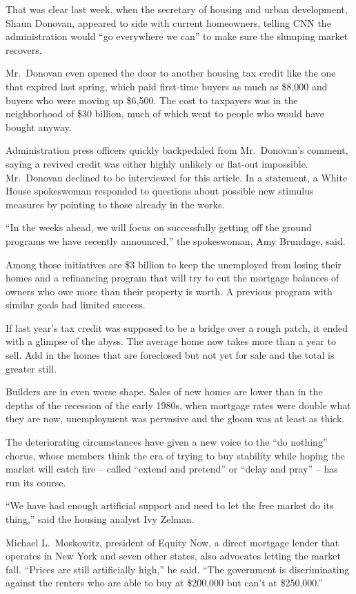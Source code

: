 ﻿\documentclass[12pt]{article}
\begin{document}
That was clear last week, when the secretary of housing and urban development, Shaun Donovan,
appeared to side with current homeowners, telling CNN the administration would ``go everywhere we
can'' to make sure the slumping market recovers.

Mr.~Donovan even opened the door to another housing tax credit like the one that expired last
spring, which paid first-time buyers as much as \$8,000 and buyers who were moving up \$6,500. The
cost to taxpayers was in the neighborhood of \$30 billion, much of which went to people who would
have bought anyway.

Administration press officers quickly backpedaled from Mr.~Donovan's comment, saying a revived
credit was either highly unlikely or flat-out impossible. Mr.~Donovan declined to be interviewed for
this article. In a statement, a White House spokeswoman responded to questions about possible new
stimulus measures by pointing to those already in the works.

``In the weeks ahead, we will focus on successfully getting off the ground programs we have recently
announced,'' the spokeswoman, Amy Brundage, said.

Among those initiatives are \$3 billion to keep the unemployed from losing their homes and a
refinancing program that will try to cut the mortgage balances of owners who owe more than their
property is worth. A previous program with similar goals had limited success.

If last year's tax credit was supposed to be a bridge over a rough patch, it ended with a glimpse of
the abyss. The average home now takes more than a year to sell. Add in the homes that are foreclosed
but not yet for sale and the total is greater still.

Builders are in even worse shape. Sales of new homes are lower than in the depths of the recession
of the early 1980s, when mortgage rates were double what they are now, unemployment was pervasive
and the gloom was at least as thick.

The deteriorating circumstances have given a new voice to the ``do nothing'' chorus, whose members
think the era of trying to buy stability while hoping the market will catch fire -- called ``extend
and pretend'' or ``delay and pray'' -- has run its course.

``We have had enough artificial support and need to let the free market do its thing,'' said the
housing analyst Ivy Zelman.

Michael L.~Moskowitz, president of Equity Now, a direct mortgage lender that operates in New York
and seven other states, also advocates letting the market fall. ``Prices are still artificially
high,'' he said. ``The government is discriminating against the renters who are able to buy at
\$200,000 but can't at \$250,000.''
\end{document}
